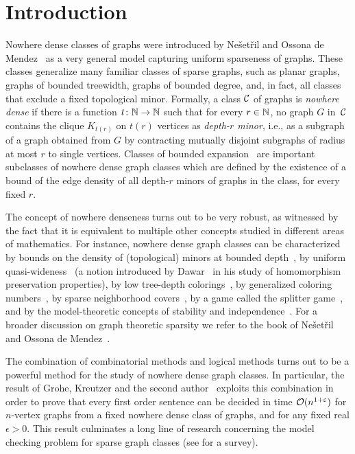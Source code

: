 \section{Introduction}\label{sec:intro}

Nowhere dense classes of graphs were introduced 
by Ne\v set\v ril and Ossona de 
Mendez~\cite{nevsetvril2010first,nevsetvril2011nowhere} as a very 
general model
capturing uniform sparseness of graphs. These classes generalize many 
familiar classes of sparse graphs, such as planar graphs, graphs 
of bounded treewidth,  graphs of bounded degree, and, in fact, 
all classes that exclude a fixed 
topological minor.
Formally, a class $\mathcal{C}$ of graphs is {\em{nowhere dense}} if there is a function $t\colon \mathbb{N}\to \mathbb{N}$ such that for every $r\in \mathbb{N}$, no graph $G$ in~$\mathcal{C}$ contains the clique $K_{t(r)}$ on $t(r)$ vertices  as  {\em{depth-$r$ minor}},
i.e., as a subgraph of a graph obtained from $G$ by contracting mutually disjoint  subgraphs of radius at most $r$ to single vertices.
Classes of bounded expansion~\cite{nevsetvril2008grad} 
are important subclasses 
of nowhere dense graph classes which are defined by the existence of a bound of 
the edge density of all depth-$r$ minors of graphs in the class, for every fixed $r$.


The concept of nowhere denseness
turns out to be very robust, as witnessed by the fact that it is equivalent 
to multiple other concepts studied in different areas of mathematics. 
For instance,  nowhere dense graph classes can be characterized 
by bounds on the density of (topological) 
minors at bounded depth~\cite{nevsetvril2010first,nevsetvril2011nowhere},
by uniform quasi-wideness~\cite{nevsetvril2011nowhere} (a notion introduced by
Dawar~\cite{dawar2010homomorphism} in his study of homomorphism
preservation properties), by low tree-depth
colorings~\cite{nevsetvril2008grad}, by generalized coloring
numbers~\cite{zhu2009coloring}, by sparse neighborhood
covers~\cite{GroheKRSS15,grohe2014deciding}, by a game called the
splitter game~\cite{grohe2014deciding}, and by the model-theoretic
concepts of stability and independence~\cite{adler2014interpreting}.
For a broader discussion on  graph theoretic sparsity we refer to the book
of Ne\v{s}et\v{r}il and Ossona de Mendez~\cite{sparsity}.

The combination of combinatorial methods and logical methods turns out to be a powerful method for the study
of nowhere dense graph classes. In particular, 
the result of Grohe, Kreutzer and the second author~\cite{grohe2014deciding} exploits 
this combination in order to prove that every
first order sentence can be decided in time 
$\mathcal{O}(n^{1+\varepsilon})$ for $n$-vertex graphs from a fixed nowhere dense class of graphs, and for any fixed real $\epsilon>0$. This result culminates a long line of research concerning the model checking problem for 
sparse graph classes (see \cite{grokre11} for a survey).
\medskip

